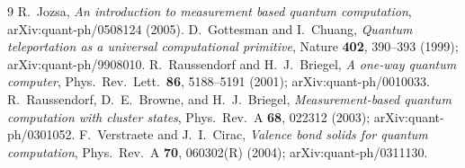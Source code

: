\documentclass[11pt]{article}
\theoremstyle{plain}
\begin{document}
\begin{thebibliography}{9}
 R.\ Jozsa, \emph{An introduction to measurement based quantum computation},
  arXiv:quant-ph/0508124 (2005).
 D.\ Gottesman and I.\ Chuang, \emph{Quantum teleportation as a universal computational
  primitive}, Nature \textbf{402}, 390--393 (1999); arXiv:quant-ph/9908010.
 R.\ Raussendorf and H.\ J.\ Briegel, \emph{A one-way quantum computer},
  Phys.\ Rev.\ Lett.\ \textbf{86}, 5188--5191 (2001); arXiv:quant-ph/0010033.
 R.\ Raussendorf, D.\ E.\ Browne, and H.\ J.\ Briegel, \emph{Measurement-based quantum
  computation with cluster states}, Phys.\ Rev.\ A \textbf{68}, 022312 (2003); arXiv:quant-ph/0301052.
 F.\ Verstraete and J.\ I.\ Cirac, \emph{Valence bond solids for quantum computation},
  Phys.\ Rev.\ A \textbf{70}, 060302(R) (2004); arXiv:quant-ph/0311130.
\end{thebibliography}
\end{document}
